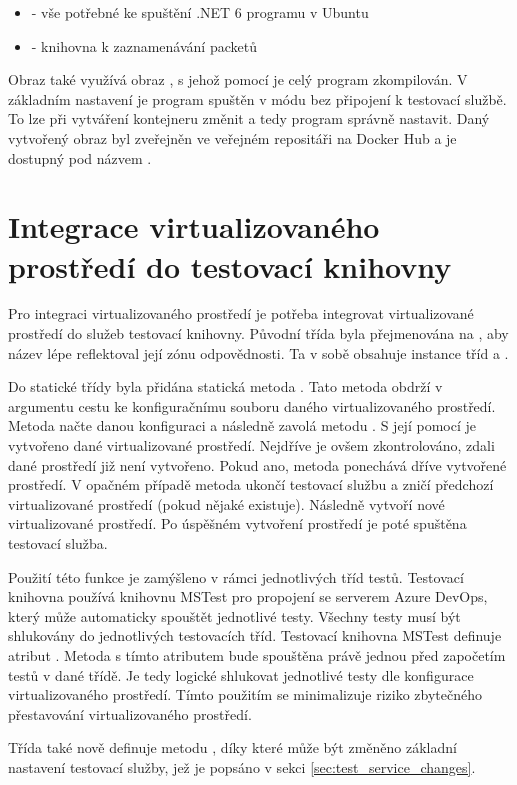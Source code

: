 \begin{itemize}
    \item {} - vše potřebné ke spuštění .NET 6 programu v Ubuntu
    \item {} - knihovna k zaznamenávání packetů 
\end{itemize}

Obraz také využívá obraz , s jehož pomocí je celý program zkompilován. V základním nastavení je program spuštěn v módu bez připojení k testovací službě. To lze při vytváření kontejneru změnit a tedy program správně nastavit. Daný vytvořený obraz byl zveřejněn ve veřejném repositáři na Docker Hub\cite{docker_hub} a je dostupný pod názvem .

\section{Integrace virtualizovaného prostředí do testovací knihovny}

Pro integraci virtualizovaného prostředí je potřeba integrovat virtualizované prostředí do služeb testovací knihovny. Původní třída  byla přejmenována na , aby název lépe reflektoval její zónu odpovědnosti. Ta v sobě obsahuje instance tříd  a .

Do statické třídy  byla přidána statická metoda . Tato metoda obdrží v argumentu cestu ke konfiguračnímu souboru daného virtualizovaného prostředí. Metoda načte danou konfiguraci a následně zavolá metodu . S její pomocí je vytvořeno dané virtualizované prostředí. Nejdříve je ovšem zkontrolováno, zdali dané prostředí již není vytvořeno. Pokud ano, metoda ponechává dříve vytvořené prostředí. V opačném případě metoda ukončí testovací službu a zničí předchozí virtualizované prostředí (pokud nějaké existuje). Následně vytvoří nové virtualizované prostředí. Po úspěšném vytvoření prostředí je poté spuštěna testovací služba.

Použití této funkce je zamýšleno v rámci jednotlivých tříd testů. Testovací knihovna používá knihovnu MSTest pro propojení se serverem Azure DevOps, který může automaticky spouštět jednotlivé testy. Všechny testy musí být shlukovány do jednotlivých testovacích tříd. Testovací knihovna MSTest definuje atribut . Metoda s tímto atributem bude spouštěna právě jednou před započetím testů v dané třídě. Je tedy logické shlukovat jednotlivé testy dle konfigurace virtualizovaného prostředí. Tímto použitím se minimalizuje riziko zbytečného přestavování virtualizovaného prostředí. 

Třída  také nově definuje metodu , díky které může být změněno základní nastavení testovací služby, jež je popsáno v sekci \ref{sec:test_service_changes}.


